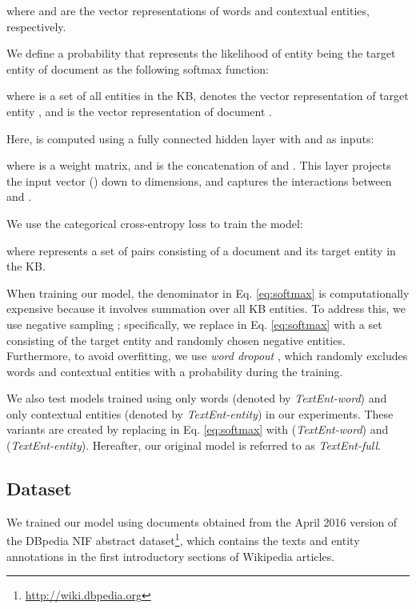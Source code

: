 \documentclass[11pt]{article}
\begin{document}
  where  and  are the vector representations of words and contextual entities, respectively.

  We define a probability that represents the likelihood of entity  being the target entity of document  as the following softmax function:
  
  where  is a set of all entities in the KB,  denotes the vector representation of target entity , and  is the vector representation of document .

  Here,  is computed using a fully connected hidden layer with  and  as inputs:
  
  where  is a weight matrix, and  is the concatenation of  and .
  This layer projects the input vector () down to  dimensions, and captures the interactions between  and .

  We use the categorical cross-entropy loss to train the model:
  
  where  represents a set of pairs consisting of a document  and its target entity  in the KB.

  When training our model, the denominator in Eq. \eqref{eq:softmax} is computationally expensive because it involves summation over all KB entities.
  To address this, we use negative sampling \cite{Mikolov2013a};
  specifically, we replace  in Eq. \eqref{eq:softmax} with a set consisting of the target entity  and  randomly chosen negative entities.
  Furthermore, to avoid overfitting, we use \textit{word dropout} \cite{iyyer-EtAl:2015}, which randomly excludes words and contextual entities with a probability  during the training.

  We also test models trained using only words (denoted by \textit{TextEnt-word}) and only contextual entities (denoted by \textit{TextEnt-entity}) in our experiments.
  These variants are created by replacing  in Eq. \eqref{eq:softmax} with  (\textit{TextEnt-word}) and  (\textit{TextEnt-entity}).
  Hereafter, our original model is referred to as \textit{TextEnt-full}.

  \subsection{Dataset}

  We trained our model using documents obtained from the April 2016 version of the DBpedia NIF abstract dataset\footnote{\url{http://wiki.dbpedia.org}}, which contains the texts and entity annotations in the first introductory sections of Wikipedia articles.
\end{document}
